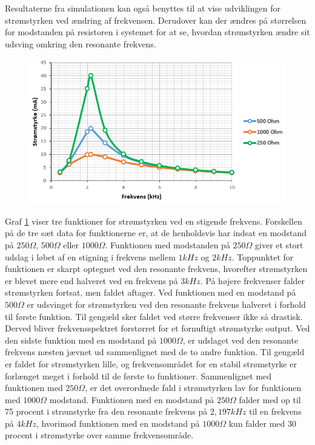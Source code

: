 Resultaterne fra simulationen kan også benyttes til at vise udviklingen for strømstyrken ved ændring af frekvensen. Derudover kan der ændres på størrelsen for modstanden på resistoren i systemet for at se, hvordan strømstyrken ændre sit udsving omkring den resonante frekvens.

\begin{figure}[H]
\centering
\includegraphics[scale=0.75]{Vildledning/Schematics/Graf_forsg1}
\caption{}
\label{figure:forsg1}
\end{figure}

Graf \ref{figure:forsg1} viser tre funktioner for strømstyrken ved en stigende frekvens. Forskellen på de tre sæt data for funktionerne er, at de henholdsvis har indsat en modstand på $250 \Omega$, $500 \Omega$ eller $1000 \Omega$. Funktionen med modstanden på $250 \Omega$ giver et stort udslag i løbet af en stigning i frekvens mellem $1 kHz$ og $2 kHz$. Toppunktet for funktionen er skarpt optegnet ved den resonante frekvens, hvorefter strømstyrken er blevet mere end halveret ved en frekvens på $3 kHz$. På højere frekvenser falder strømstyrken fortsat, men faldet aftager. Ved funktionen med en modstand på $500 \Omega$ er udsvinget for strømstyrken ved den resonante frekvens halveret i forhold til første funktion. Til gengæld sker faldet ved større frekvenser ikke så drastisk. Derved bliver frekvensspektret forstørret for et fornuftigt strømstyrke output. Ved den sidste funktion med en modstand på $1000 \Omega$, er udslaget ved den resonante frekvens næsten jævnet ud sammenlignet med de to andre funktion. Til gengæld er faldet for strømstyrken lille, og frekvensområdet for en stabil strømstyrke er forlænget meget i forhold til de første to funktioner. Sammenlignet med funktionen med $250 \Omega$, er det overordnede fald i strømstyrken lav for funktionen med $1000 \Omega$ modstand. Funktionen med en modstand på $250 \Omega$ falder med op til 75 procent i strømstyrke fra den resonante frekvens på $2,197 kHz$ til en frekvens på $4 kHz$, hvorimod funktionen med en modstand på $1000 \Omega$ kun falder med 30 procent i strømstyrke over samme frekvensområde.

